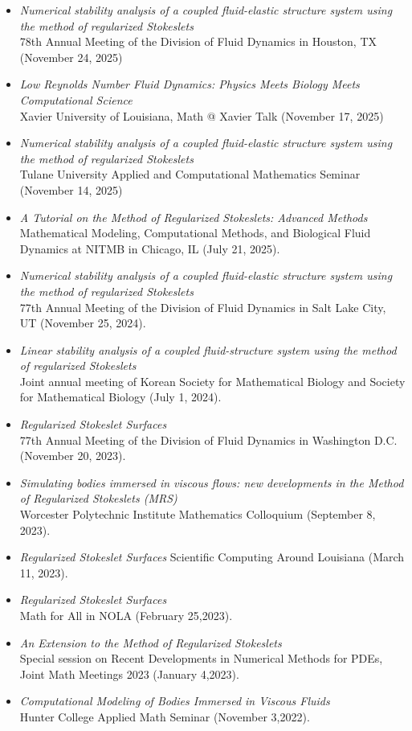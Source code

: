 \documentclass[10pt]{article}
\newenvironment{outerlist}[1][\enskip\textbullet]%
        {\begin{itemize}[#1]}{\end{itemize}%
         \vspace{-0.6\baselineskip}}
\begin{document}
\begin{outerlist}
  \item \textit{Numerical stability analysis of a coupled fluid-elastic structure system using the method of regularized Stokeslets} \\
  78th Annual Meeting of the Division of Fluid Dynamics in Houston, TX (November 24, 2025)
\item \textit{Low Reynolds Number Fluid Dynamics: Physics Meets Biology Meets Computational Science}\\
  Xavier University of Louisiana, Math @ Xavier Talk (November 17, 2025)
\item \textit{Numerical stability analysis of a coupled fluid-elastic structure system using the method of regularized Stokeslets} \\
  Tulane University Applied and Computational Mathematics Seminar (November 14, 2025) 
\item \textit{A Tutorial on the Method of Regularized Stokeslets: Advanced Methods} \\
  Mathematical Modeling, Computational Methods, and Biological Fluid Dynamics at NITMB in Chicago, IL (July 21, 2025).
\item \textit{Numerical stability analysis of a coupled fluid-elastic structure system using the method of regularized Stokeslets} \\
    77th Annual Meeting of the Division of Fluid Dynamics in Salt Lake City, UT (November 25, 2024).
\item \textit{Linear stability analysis of a coupled fluid-structure system using the method of regularized Stokeslets} \\
  Joint annual meeting of Korean Society for Mathematical Biology and Society for Mathematical Biology (July 1, 2024).
\item \textit{Regularized Stokeslet Surfaces} \\
  77th Annual Meeting of the Division of Fluid Dynamics in Washington D.C. (November 20, 2023).
\item \textit{Simulating bodies immersed in viscous flows: new developments
    in the Method of Regularized Stokeslets (MRS)} \\
  Worcester Polytechnic Institute Mathematics Colloquium (September 8, 2023).
\item \textit{Regularized Stokeslet Surfaces}
  Scientific Computing Around Louisiana (March 11, 2023).
\item \textit{Regularized Stokeslet Surfaces} \\
  Math for All in NOLA (February 25,2023).
\item \textit{An Extension to the Method of Regularized Stokeslets} \\
  Special session on Recent Developments in Numerical Methods for PDEs, Joint Math Meetings 2023 (January 4,2023).
  \item \textit{Computational Modeling of Bodies Immersed in Viscous Fluids} \\ Hunter College Applied Math Seminar (November 3,2022). 
\end{outerlist}
\end{document}
